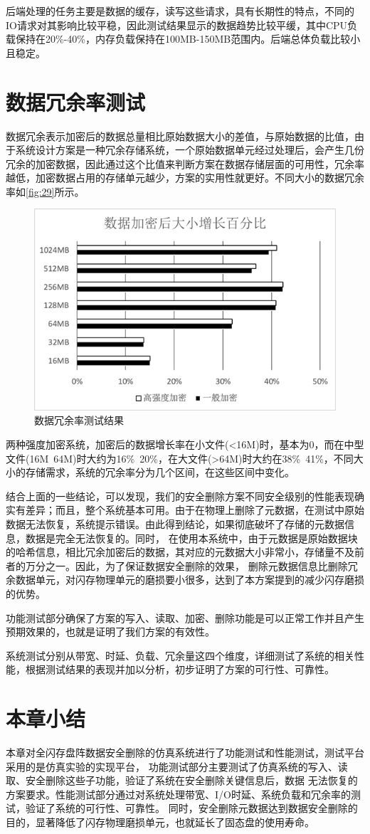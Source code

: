后端处理的任务主要是数据的缓存，读写这些请求，具有长期性的特点，不同的IO请求对其影响比较平稳，因此测试结果显示的数据趋势比较平缓，其中CPU负载保持在20\%-40\%，内存负载保持在100MB-150MB范围内。后端总体负载比较小且稳定。
\section{数据冗余率测试}
数据冗余表示加密后的数据总量相比原始数据大小的差值，与原始数据的比值，由于系统设计方案是一种冗余存储系统，一个原始数据单元经过处理后，会产生几份冗余的加密数据，因此通过这个比值来判断方案在数据存储层面的可用性，冗余率越低，加密数据占用的存储单元越少，方案的实用性就更好。不同大小的数据冗余率如\autoref{fig:29}所示。
\begin{figure}[H]
	\centering
	\includegraphics[width=1\textwidth]{Pics/data-ry.png}
	\caption{数据冗余率测试结果}
	\label{fig:29}
\end{figure}
两种强度加密系统，加密后的数据增长率在小文件(<16M)时，基本为0，而在中型文件(16M~64M)时大约为16\%~20\%，在大文件(>64M)时大约在38\%~41\%，不同大小的存储需求，系统的冗余率分为几个区间，在这些区间中变化。


结合上面的一些结论，可以发现，我们的安全删除方案不同安全级别的性能表现确实有差异；而且，整个系统基本可用。由于在物理上删除了元数据，在测试中原始数据无法恢复，系统提示错误。由此得到结论，如果彻底破坏了存储的元数据信息，数据是完全无法恢复的。同时，
在使用本系统中，由于元数据是原始数据块的哈希信息，相比冗余加密后的数据，其对应的元数据大小非常小，存储量不及前者的万分之一。因此，为了保证数据安全删除的效果，
删除元数据信息比删除冗余数据单元，对闪存物理单元的磨损要小很多，达到了本方案提到的减少闪存磨损的优势。


功能测试部分确保了方案的写入、读取、加密、删除功能是可以正常工作并且产生预期效果的，也就是证明了我们方案的有效性。


系统测试分别从带宽、时延、负载、冗余量这四个维度，详细测试了系统的相关性能，根据测试结果的表现并加以分析，初步证明了方案的可行性、可靠性。

\section{本章小结}
本章对全闪存盘阵数据安全删除的仿真系统进行了功能测试和性能测试，测试平台采用的是仿真实验的实现平台，
功能测试部分主要测试了仿真系统的写入、读取、安全删除这些子功能，验证了系统在安全删除关键信息后，数据
无法恢复的方案要求。性能测试部分通过对系统处理带宽、I/O时延、系统负载和冗余率的测试，验证了系统的可行性、可靠性。
同时，安全删除元数据达到数据安全删除的目的，显著降低了闪存物理磨损单元，也就延长了固态盘的使用寿命。
